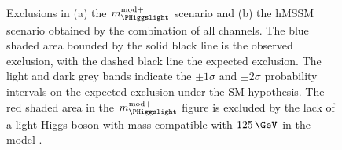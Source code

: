 \begin{figure}[h!]
\begin{center}
~\\
\end{center}
\caption[Exclusions in the $m_{\PHiggslight}^{\text{mod+}}$ scenario and the hMSSM
scenario of the \AHtotautau analysis.]{Exclusions in (a) the $m_{\PHiggslight}^{\text{mod}+}$ scenario and (b) the hMSSM scenario 
obtained by the combination
of all channels. The blue shaded area bounded by the 
solid black line is the observed exclusion, with the dashed black line the
expected exclusion. The light and dark grey bands indicate
the $\pm 1\sigma$ and $\pm 2\sigma$ probability intervals on the expected exclusion under the \ac{SM} hypothesis.
The red shaded area in the $m_{\PHiggslight}^{\text{mod}+}$ figure
is excluded by the lack of a light Higgs boson with mass compatible with $125\,\GeV$ in the model \cite{CMS-PAS-HIG-16-037}.}
\label{fig:mssm_mhmodp_2016}
\end{figure}

